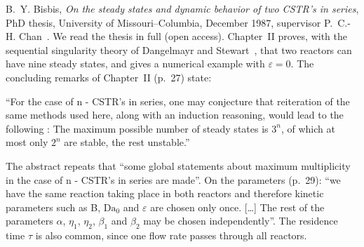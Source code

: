 \documentclass[11pt,a4paper]{report}
\newcommand*{\Da}{\mathrm{Da}_0}
\newcommand*{\eps}{\varepsilon}
\begin{document}
B.~Y. Bisbis, \emph{On the steady states and dynamic behavior of two CSTR's in series}, PhD thesis, University of
Missouri--Columbia, December 1987, supervisor P.~C.-H. Chan~\autocite{Bisbis1987}. We read the thesis in full (open
access). Chapter~II proves, with the sequential singularity theory of Dangelmayr and
Stewart~\autocite{DangelmayrStewart1984,DangelmayrStewart1985}, that two reactors can have nine steady states, and gives
a numerical example with \(\eps=0\). The concluding remarks of Chapter~II (p.~27) state:
\begin{openquote}
``For the case of n - CSTR's in series, one may conjecture that reiteration of the same methods used here, along with
an induction reasoning, would lead to the following : The maximum possible number of steady states is \(3^n\), of which
at most only \(2^n\) are stable, the rest unstable.''
\end{openquote}
The abstract repeats that ``some global statements about maximum multiplicity in the case of n - CSTR's in series are
made''. On the parameters (p.~29): ``we have the same reaction taking place in both reactors and therefore kinetic
parameters such as B, \(\Da\) and \(\eps\) are chosen only once. [\ldots] The rest of the parameters \(\alpha\),
\(\eta_1\), \(\eta_2\), \(\beta_1\) and \(\beta_2\) may be chosen independently''. The residence time \(\tau\) is also
common, since one flow rate passes through all reactors.
\end{document}
